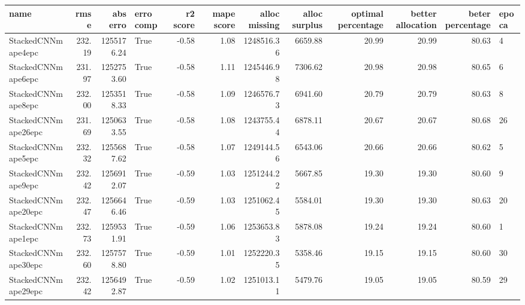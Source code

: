 \begin{tabular}{lrrlrrrrrrrl}
\toprule
name & rmse & abs erro & erro comp & r2 score & mape score & alloc missing & alloc surplus & optimal percentage & better allocation & beter percentage & epoca \\
\midrule
StackedCNNmape4epc & 232.19 & 1255176.24 & True & -0.58 & 1.08 & 1248516.36 & 6659.88 & 20.99 & 20.99 & 80.63 & 4 \\
StackedCNNmape6epc & 231.97 & 1252753.60 & True & -0.58 & 1.11 & 1245446.98 & 7306.62 & 20.98 & 20.98 & 80.65 & 6 \\
StackedCNNmape8epc & 232.00 & 1253518.33 & True & -0.58 & 1.09 & 1246576.73 & 6941.60 & 20.79 & 20.79 & 80.63 & 8 \\
StackedCNNmape26epc & 231.69 & 1250633.55 & True & -0.58 & 1.08 & 1243755.44 & 6878.11 & 20.67 & 20.67 & 80.68 & 26 \\
StackedCNNmape5epc & 232.32 & 1255687.62 & True & -0.58 & 1.07 & 1249144.56 & 6543.06 & 20.66 & 20.66 & 80.62 & 5 \\
StackedCNNmape9epc & 232.42 & 1256912.07 & True & -0.59 & 1.03 & 1251244.22 & 5667.85 & 19.30 & 19.30 & 80.60 & 9 \\
StackedCNNmape20epc & 232.47 & 1256646.46 & True & -0.59 & 1.03 & 1251062.45 & 5584.01 & 19.30 & 19.30 & 80.63 & 20 \\
StackedCNNmape1epc & 232.73 & 1259531.91 & True & -0.59 & 1.06 & 1253653.83 & 5878.08 & 19.24 & 19.24 & 80.60 & 1 \\
StackedCNNmape30epc & 232.60 & 1257578.80 & True & -0.59 & 1.01 & 1252220.35 & 5358.46 & 19.15 & 19.15 & 80.60 & 30 \\
StackedCNNmape29epc & 232.42 & 1256492.87 & True & -0.59 & 1.02 & 1251013.11 & 5479.76 & 19.05 & 19.05 & 80.59 & 29 \\
\bottomrule
\end{tabular}
